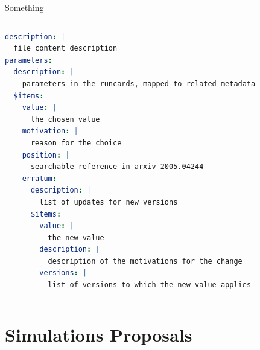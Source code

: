 \documentclass[9pt]{beamer}
\begin{document}
\begin{frame}[fragile]{Something}
    \begin{columns}
        \begin{column}{0.5\textwidth}
            \begin{lstlisting}[language=yaml, style=mystyle, breaklines=true]
description: |
  file content description
parameters:
  description: |
    parameters in the runcards, mapped to related metadata
  $items:
    value: |
      the chosen value
    motivation: |
      reason for the choice
    position: |
      searchable reference in arxiv 2005.04244
    erratum:
      description: |
        list of updates for new versions
      $items:
        value: |
          the new value
        description: |
          description of the motivations for the change
        versions: |
          list of versions to which the new value applies
\end{lstlisting}
        \end{column}
        \begin{column}{0.5\textwidth}
        \end{column}
    \end{columns}
\end{frame}

\section{Simulations Proposals}
\end{document}
